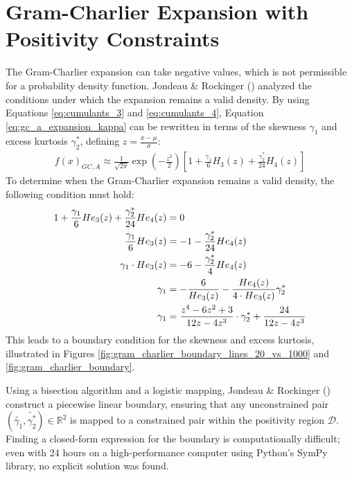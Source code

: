 \section{Gram-Charlier Expansion with Positivity Constraints}

The Gram-Charlier expansion can take negative values, which is not permissible for a probability density function. Jondeau \& Rockinger (\citeyear{jondeauGramCharlierDensities2001}) analyzed the conditions under which the expansion remains a valid density. By using Equations \eqref{eq:cumulants_3} and \eqref{eq:cumulants_4}, Equation \eqref{eq:gc_a_expansion_kappa} can be rewritten in terms of the skewness $\gamma_1$ and excess kurtosis $\gamma_2^*$, defining $z = \frac{x-\mu}{\sigma}$:
\begin{align}
    \label{eq:gc_a_expansion_s_ek}
    f(x)_{GC,A} \approx \frac{1}{\sqrt{2\pi}}\exp\left(-\frac{z^2}{2}\right) \left[1 + \frac{\gamma_1}{6}H_3(z) + \frac{\gamma_2^*}{24}H_4(z)\right]
\end{align}
To determine when the Gram-Charlier expansion remains a valid density, the following condition must hold:
\begin{align}
    1 + \frac{\gamma_1}{6}He_3(z) + \frac{\gamma_2^*}{24}He_4(z) &= 0 \notag \\
    \frac{\gamma_1}{6}He_3(z) &= -1 - \frac{\gamma_2^*}{24}He_4(z) \notag \\
    \gamma_1\cdot He_3(z) &= -6 - \frac{\gamma_2^*}{4}He_4(z) \notag \\
    \gamma_1 &= -\frac{6}{He_3(z)} - \frac{He_4(z)}{4\cdot He_3(z)}\gamma_2^* \notag \\
    \gamma_1 &= \frac{z^4-6z^2+3}{12z-4z^3}\cdot \gamma_2^* + \frac{24}{12z-4z^3} \notag
\end{align}
This leads to a boundary condition for the skewness and excess kurtosis, illustrated in Figures \ref{fig:gram_charlier_boundary_lines_20_vs_1000} and \ref{fig:gram_charlier_boundary}.

Using a bisection algorithm and a logistic mapping, Jondeau \& Rockinger (\citeyear{jondeauGramCharlierDensities2001}) construct a piecewise linear boundary, ensuring that any unconstrained pair $(\tilde{\gamma_1}, \tilde{\gamma_2^*}) \in \mathbb{R}^2$ is mapped to a constrained pair within the positivity region $\mathcal{D}$. Finding a closed-form expression for the boundary is computationally difficult; even with 24 hours on a high-performance computer using Python's SymPy library, no explicit solution was found.

